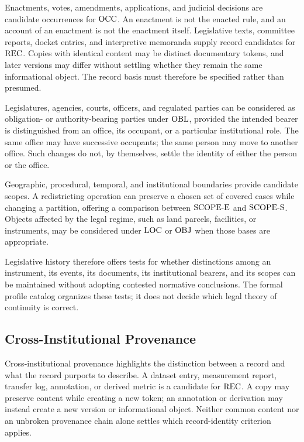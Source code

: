 Enactments, votes, amendments, applications, and judicial decisions are
candidate occurrences for $\mathrm{OCC}$.
An enactment is not the enacted rule,
and an account of an enactment is not the enactment itself.
Legislative
texts, committee reports, docket entries, and interpretive memoranda
supply record candidates for $\mathrm{REC}$.
Copies with identical content may
be distinct documentary tokens, and later versions may differ without
settling whether they remain the same informational object.
The record
basis must therefore be specified rather than presumed.

Legislatures, agencies, courts, officers, and regulated parties can be
considered as obligation- or authority-bearing parties under $\mathrm{OBL}$,
provided the intended bearer is distinguished from an office, its
occupant, or a particular institutional role.
The same office may have
successive occupants; the same person may move to another office.
Such changes do not, by themselves, settle the identity of either the
person or the office.

Geographic, procedural, temporal, and institutional boundaries provide
candidate scopes.
A redistricting operation can preserve a chosen set
of covered cases while changing a partition, offering a comparison
between $\mathrm{SCOPE\text{-}E}$ and $\mathrm{SCOPE\text{-}S}$.
Objects affected by the legal regime,
such as land parcels, facilities, or instruments, may be considered
under $\mathrm{LOC}$ or $\mathrm{OBJ}$ when those bases are appropriate.

Legislative history therefore offers tests for whether distinctions
among an instrument, its events, its documents, its institutional
bearers, and its scopes can be maintained without adopting contested
normative conclusions.
The formal profile catalog organizes these
tests; it does not decide which legal theory of continuity is correct.

\subsection{Cross-Institutional Provenance}
\label{subsec:app_provenance}

Cross-institutional provenance highlights the distinction between a
record and what the record purports to describe.
A dataset entry,
measurement report, transfer log, annotation, or derived metric is a
candidate for $\mathrm{REC}$.
A copy may preserve content while creating a
new token; an annotation or derivation may instead create a new version
or informational object.
Neither common content nor an unbroken
provenance chain alone settles which record-identity criterion applies.

